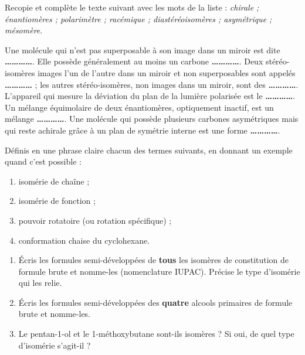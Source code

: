 \documentclass[11pt]{article}
\newcommand{\cle}[1]{{\popxbold\color{popdark}#1}}
\newcounter{popsec}
\newcounter{popsub}
\newcommand{\courssub}[1]{%
  \stepcounter{popsub}%
  \par\vspace{9pt}\noindent{\popxbold\fontsize{11.5}{13}\selectfont\color{popink}{\color{poporange}\thepopsec.\thepopsub}\hspace{6pt}#1}\par\nopagebreak\vspace{4pt}
}
\begin{document}
\begin{exercice}
Recopie et complète le texte suivant avec les mots de la liste : \emph{chirale ; énantiomères ; polarimètre ; racémique ; diastéréoisomères ; asymétrique ; mésomère}.

Une molécule qui n'est pas superposable à son image dans un miroir est dite \textbf{\ldots\ldots\ldots\ldots}. Elle possède généralement au moins un carbone \textbf{\ldots\ldots\ldots\ldots}. Deux stéréo-isomères images l'un de l'autre dans un miroir et non superposables sont appelés \textbf{\ldots\ldots\ldots\ldots} ; les autres stéréo-isomères, non images dans un miroir, sont des \textbf{\ldots\ldots\ldots\ldots}. L'appareil qui mesure la déviation du plan de la lumière polarisée est le \textbf{\ldots\ldots\ldots\ldots}. Un mélange équimolaire de deux énantiomères, optiquement inactif, est un mélange \textbf{\ldots\ldots\ldots\ldots}. Une molécule qui possède plusieurs carbones asymétriques mais qui reste achirale grâce à un plan de symétrie interne est une forme \textbf{\ldots\ldots\ldots\ldots}.
\end{exercice}

\begin{exercice}
Définis en une phrase claire chacun des termes suivants, en donnant un exemple quand c'est possible :
\begin{enumerate}
\item \cle{isomérie de chaîne} ;
\item \cle{isomérie de fonction} ;
\item \cle{pouvoir rotatoire} (ou rotation spécifique) ;
\item \cle{conformation chaise} du cyclohexane.
\end{enumerate}
\end{exercice}

\courssub{Je m'entraîne}

\begin{exercice}
\begin{enumerate}
\item Écris les formules semi-développées de \textbf{tous} les isomères de constitution de formule brute  et nomme-les (nomenclature IUPAC). Précise le type d'isomérie qui les relie.
\item Écris les formules semi-développées des \textbf{quatre} alcools primaires de formule brute  et nomme-les.
\item Le pentan-1-ol et le 1-méthoxybutane  sont-ils isomères ? Si oui, de quel type d'isomérie s'agit-il ?
\end{enumerate}
\end{exercice}
\end{document}
